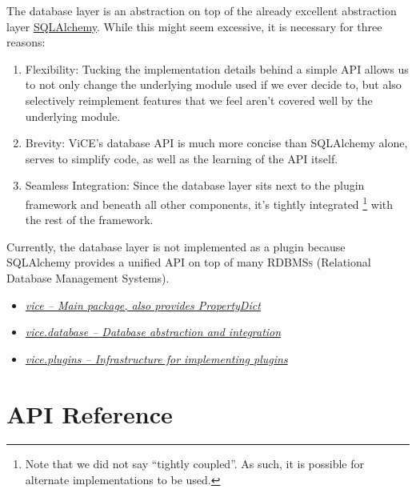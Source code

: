 \documentclass[letterpaper,10pt,english]{sphinxmanual}
\begin{document}
The database layer is an abstraction on top of
the already excellent abstraction layer \href{http://sqlalchemy.org}{SQLAlchemy}.
While this might seem excessive, it is necessary for three reasons:
\begin{enumerate}
\item {} 
Flexibility: Tucking the implementation details behind a simple API allows
us to not only change the underlying module used if we ever decide to, but
also selectively reimplement features that we feel aren't covered well by
the underlying module.

\item {} 
Brevity: ViCE's database API is much more concise than SQLAlchemy alone,
serves to simplify code, as well as the learning of the API itself.

\item {} 
Seamless Integration: Since the database layer sits next to the plugin
framework and beneath all other components, it's tightly integrated \footnote{
Note that we did not say ``tightly coupled''. As such, it is possible
for alternate implementations to be used.
}
with the rest of the framework.

\end{enumerate}

Currently, the database layer is not implemented as a plugin because
SQLAlchemy provides a unified API on top of many
\textsc{RDBMSs} (Relational Database Management Systems).



\begin{itemize}
\item {} 
{\hyperref[api_reference:vice]{\emph{vice -- Main package, also provides PropertyDict}}}

\item {} 
{\hyperref[api_reference:vice-database]{\emph{vice.database -- Database abstraction and integration}}}

\item {} 
{\hyperref[api_reference:vice-plugins]{\emph{vice.plugins -- Infrastructure for implementing plugins}}}

\end{itemize}




\part{API Reference}
\label{api_reference:api-reference}\label{api_reference::doc}
\end{document}
